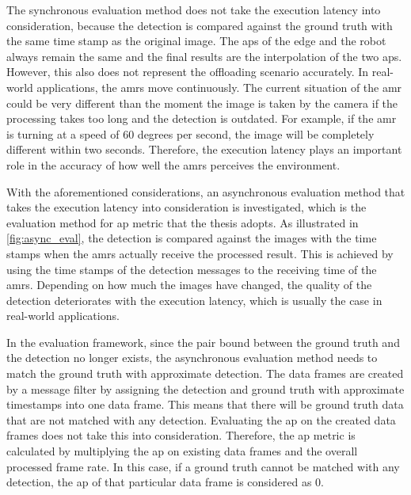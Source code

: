 The synchronous evaluation method does not take the execution latency into consideration, because the detection is compared against the ground truth with the same time stamp as the original image. The \glspl{ap} of the edge and the robot always remain the same and the final results are the interpolation of the two \glspl{ap}. However, this also does not represent the offloading scenario accurately. In real-world applications, the \glspl{amr} move continuously. The current situation of the \gls{amr} could be very different than the moment the image is taken by the camera if the processing takes too long and the detection is outdated. For example, if the \gls{amr} is turning at a speed of 60 degrees per second, the image will be completely different within two seconds. Therefore, the execution latency plays an important role in the accuracy of how well the \glspl{amr} perceives the environment. 

With the aforementioned considerations, an asynchronous evaluation method that takes the execution latency into consideration is investigated, which is the evaluation method for \gls{ap} metric that the thesis adopts. As illustrated in \cref{fig:async_eval}, the detection is compared against the images with the time stamps when the \glspl{amr} actually receive the processed result. This is achieved by using the time stamps of the detection messages to the receiving time of the \glspl{amr}. Depending on how much the images have changed, the quality of the detection deteriorates with the execution latency, which is usually the case in real-world applications.

In the evaluation framework, since the pair bound between the ground truth and the detection no longer exists, the asynchronous evaluation method needs to match the ground truth with approximate detection. The data frames are created by a message filter by assigning the detection and ground truth with approximate timestamps into one data frame. This means that there will be ground truth data that are not matched with any detection. Evaluating the \gls{ap} on the created data frames does not take this into consideration. Therefore, the \gls{ap} metric is calculated by multiplying the \gls{ap} on existing data frames and the overall processed frame rate. In this case, if a ground truth cannot be matched with any detection, the \gls{ap} of that particular data frame is considered as 0.


